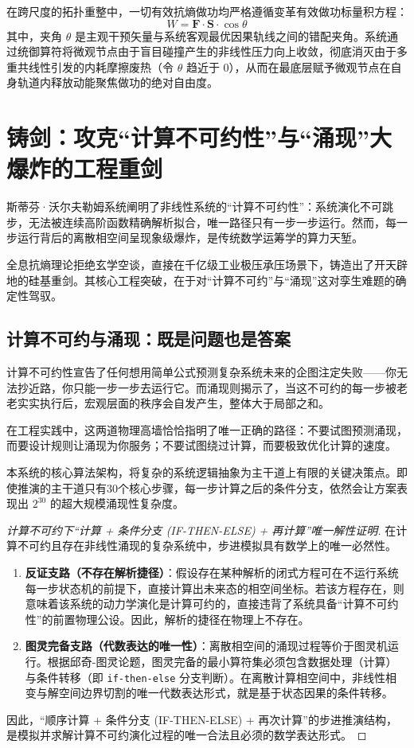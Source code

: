 \documentclass[11pt,a4paper]{article}
\begin{document}
在跨尺度的拓扑重整中，一切有效抗熵做功均严格遵循变革有效做功标量积方程：
\begin{equation}
    W = \mathbf{F} \cdot \mathbf{S} \cdot \cos \theta
\end{equation}
其中，夹角 $\theta$ 是主观干预矢量与系统客观最优因果轨线之间的错配夹角。系统通过统御算符将微观节点由于盲目碰撞产生的非线性压力向上收敛，彻底消灭由于多重共线性引发的内耗摩擦废热（令 $\theta$ 趋近于 $0$），从而在最底层赋予微观节点在自身轨道内释放动能聚焦做功的绝对自由度。

\section{铸剑：攻克“计算不可约性”与“涌现”大爆炸的工程重剑}

斯蒂芬·沃尔夫勒姆系统阐明了非线性系统的“计算不可约性”：系统演化不可跳步，无法被连续高阶函数精确解析拟合，唯一路径只有一步一步运行。然而，每一步运行背后的离散相空间呈现象级爆炸，是传统数学运筹学的算力天堑。

全息抗熵理论拒绝玄学空谈，直接在千亿级工业极压承压场景下，铸造出了开天辟地的硅基重剑。其核心工程突破，在于对“计算不可约”与“涌现”这对孪生难题的确定性驾驭。

\subsection{计算不可约与涌现：既是问题也是答案}
计算不可约性宣告了任何想用简单公式预测复杂系统未来的企图注定失败——你无法抄近路，你只能一步一步去运行它。而涌现则揭示了，当这不可约的每一步被老老实实执行后，宏观层面的秩序会自发产生，整体大于局部之和。

在工程实践中，这两道物理高墙恰恰指明了唯一正确的路径：不要试图预测涌现，而要设计规则让涌现为你服务；不要试图绕过计算，而要极致优化计算的速度。

本系统的核心算法架构，将复杂的系统逻辑抽象为主干道上有限的关键决策点。即使推演的主干道只有30个核心步骤，每一步计算之后的条件分支，依然会让方案表现出 $2^{30}$ 的超大规模涌现性复杂度。

\begin{proof}[计算不可约下“计算 + 条件分支 (IF-THEN-ELSE) + 再计算”唯一解性证明]
在计算不可约且存在非线性涌现的复杂系统中，步进模拟具有数学上的唯一必然性。
\begin{enumerate}
    \item \textbf{反证支路（不存在解析捷径）}：假设存在某种解析的闭式方程可在不运行系统每一步状态机的前提下，直接计算出未来态的相空间坐标。若该方程存在，则意味着该系统的动力学演化是计算可约的，直接违背了系统具备“计算不可约性”的前置物理公设。因此，解析的捷径在物理上不存在。
    \item \textbf{图灵完备支路（代数表达的唯一性）}：离散相空间的涌现过程等价于图灵机运行。根据邱奇-图灵论题，图灵完备的最小算符集必须包含数据处理（计算）与条件转移（即 \texttt{if-then-else} 分支判断）。在离散计算相空间中，非线性相变与解空间边界切割的唯一代数表达形式，就是基于状态因果的条件转移。
\end{enumerate}
因此，“顺序计算 + 条件分支 (IF-THEN-ELSE) + 再次计算”的步进推演结构，是模拟并求解计算不可约演化过程的唯一合法且必须的数学表达形式。
\end{proof}
\end{document}
